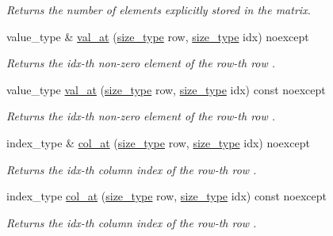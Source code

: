 \begin{DoxyCompactItemize}
\begin{DoxyCompactList}\small\item\em Returns the number of elements explicitly stored in the matrix. \end{DoxyCompactList}\item 
value\+\_\+type \& \hyperlink{classgko_1_1matrix_1_1Ell_a0d2365837e44dc1889fc16000ff3b0a9}{val\+\_\+at} (\hyperlink{namespacegko_a6e5c95df0ae4e47aab2f604a22d98ee7}{size\+\_\+type} row, \hyperlink{namespacegko_a6e5c95df0ae4e47aab2f604a22d98ee7}{size\+\_\+type} idx) noexcept
\begin{DoxyCompactList}\small\item\em Returns the {\ttfamily idx}-\/th non-\/zero element of the {\ttfamily row}-\/th row . \end{DoxyCompactList}\item 
value\+\_\+type \hyperlink{classgko_1_1matrix_1_1Ell_a3591fa0ab2ec09b43a15b0f0649d8ea3}{val\+\_\+at} (\hyperlink{namespacegko_a6e5c95df0ae4e47aab2f604a22d98ee7}{size\+\_\+type} row, \hyperlink{namespacegko_a6e5c95df0ae4e47aab2f604a22d98ee7}{size\+\_\+type} idx) const noexcept
\begin{DoxyCompactList}\small\item\em Returns the {\ttfamily idx}-\/th non-\/zero element of the {\ttfamily row}-\/th row . \end{DoxyCompactList}\item 
index\+\_\+type \& \hyperlink{classgko_1_1matrix_1_1Ell_a1ef17227a6de85a1c12ebc106abbfc32}{col\+\_\+at} (\hyperlink{namespacegko_a6e5c95df0ae4e47aab2f604a22d98ee7}{size\+\_\+type} row, \hyperlink{namespacegko_a6e5c95df0ae4e47aab2f604a22d98ee7}{size\+\_\+type} idx) noexcept
\begin{DoxyCompactList}\small\item\em Returns the {\ttfamily idx}-\/th column index of the {\ttfamily row}-\/th row . \end{DoxyCompactList}\item 
index\+\_\+type \hyperlink{classgko_1_1matrix_1_1Ell_a1ac1702011ead4e56857de130b4a5301}{col\+\_\+at} (\hyperlink{namespacegko_a6e5c95df0ae4e47aab2f604a22d98ee7}{size\+\_\+type} row, \hyperlink{namespacegko_a6e5c95df0ae4e47aab2f604a22d98ee7}{size\+\_\+type} idx) const noexcept
\begin{DoxyCompactList}\small\item\em Returns the {\ttfamily idx}-\/th column index of the {\ttfamily row}-\/th row . \end{DoxyCompactList}\end{DoxyCompactItemize}
